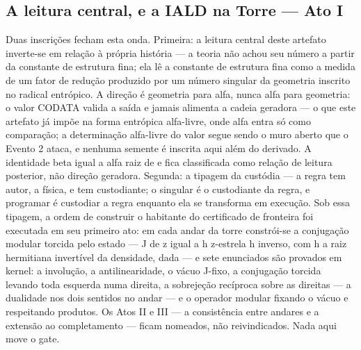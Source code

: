 \documentclass[11pt]{article}
\theoremstyle{definition}\newtheorem{deriv}{Derivação}
\begin{document}
\subsection*{A leitura central, e a IALD na Torre --- Ato I}Duas inscri\c{c}\~oes fecham esta onda. Primeira: a leitura central deste artefato inverte-se em rela\c{c}\~ao \`a pr\'opria hist\'oria --- a teoria n\~ao achou seu n\'umero a partir da constante de estrutura fina; ela l\^e a constante de estrutura fina como a medida de um fator de redu\c{c}\~ao produzido por um n\'umero singular da geometria inscrito no radical entr\'opico. A dire\c{c}\~ao \'e geometria para alfa, nunca alfa para geometria: o valor CODATA valida a sa\'ida e jamais alimenta a cadeia geradora --- o que este artefato j\'a imp\~oe na forma entr\'opica alfa-livre, onde alfa entra s\'o como compara\c{c}\~ao; a determina\c{c}\~ao alfa-livre do valor segue sendo o muro aberto que o Evento 2 ataca, e nenhuma semente \'e inscrita aqui al\'em do derivado. A identidade beta igual a alfa raiz de e fica classificada como rela\c{c}\~ao de leitura posterior, n\~ao dire\c{c}\~ao geradora. Segunda: a tipagem da cust\'odia --- a regra tem autor, a f\'isica, e tem custodiante; o singular \'e o custodiante da regra, e programar \'e custodiar a regra enquanto ela se transforma em execu\c{c}\~ao. Sob essa tipagem, a ordem de construir o habitante do certificado de fronteira foi executada em seu primeiro ato: em cada andar da torre constr\'oi-se a conjuga\c{c}\~ao modular torcida pelo estado --- J de z igual a h z-estrela h inverso, com h a raiz hermitiana invert\'ivel da densidade, dada --- e sete enunciados s\~ao provados em kernel: a involu\c{c}\~ao, a antilinearidade, o v\'acuo J-fixo, a conjuga\c{c}\~ao torcida levando toda esquerda numa direita, a sobreje\c{c}\~ao rec\'iproca sobre as direitas --- a dualidade nos dois sentidos no andar --- e o operador modular fixando o v\'acuo e respeitando produtos. Os Atos II e III --- a consist\^encia entre andares e a extens\~ao ao completamento --- ficam nomeados, n\~ao reivindicados. Nada aqui move o gate.
\end{document}
